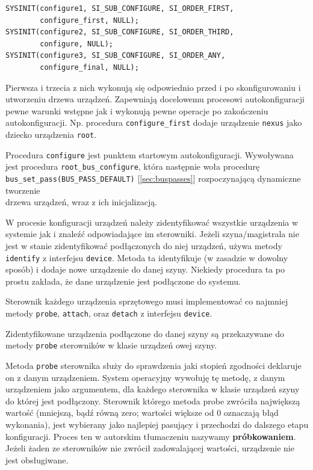 \documentclass[shortabstract,inz]{iithesis}
\begin{document}
\begin{lstlisting}[caption=Rejestracja procedur w podsystemie sysinit.]
SYSINIT(configure1, SI_SUB_CONFIGURE, SI_ORDER_FIRST, 
        configure_first, NULL);
SYSINIT(configure2, SI_SUB_CONFIGURE, SI_ORDER_THIRD, 
        configure, NULL);
SYSINIT(configure3, SI_SUB_CONFIGURE, SI_ORDER_ANY, 
        configure_final, NULL);
\end{lstlisting}

Pierwsza i trzecia z nich wykonują się odpowiednio przed i po skonfigurowaniu i utworzeniu drzewa urządzeń.
Zapewniają docelowemu procesowi autokonfiguracji pewne warunki wstępne jak i wykonują pewne operacje po
zakończeniu autokonfiguracji. Np. procedura \texttt{configure\_first} dodaje urządzenie \texttt{nexus}
jako dziecko urządzenia \texttt{root}.

Procedura \texttt{configure} jest punktem startowym autokonfiguracji.
Wywoływana jest procedura \texttt{root\_bus\_configure}, która następnie woła procedurę\\
\texttt{bus\_set\_pass(BUS\_PASS\_DEFAULT)} [\ref{sec:buspasses}] rozpoczynającą dynamiczne tworzenie \\
drzewa urządzeń, wraz z ich inicjalizacją.

W procesie konfiguracji urządzeń należy zidentyfikować wszystkie urządzenia w systemie jak i 
znaleźć odpowiadające im sterowniki. Jeżeli szyna/magistrala nie jest w stanie zidentyfikować
podłączonych do niej urządzeń, używa metody \texttt{identify} z interfejsu \texttt{device}.
Metoda ta identyfikuje (w zasadzie w dowolny sposób) i dodaje nowe urządzenie do danej szyny.
Niekiedy procedura ta po prostu zakłada, że dane urządzenie jest podłączone do systemu.

Sterownik każdego urządzenia sprzętowego musi implementować co najmniej metody \texttt{probe},
\texttt{attach}, oraz \texttt{detach} z interfejsu \texttt{device}.

Zidentyfikowane urządzenia podłączone do danej szyny są przekazywane do metody \texttt{probe}
sterowników w klasie urządzeń owej szyny. 

Metoda \texttt{probe} sterownika służy do sprawdzenia jaki stopień zgodności deklaruje on z danym urządzeniem.
System operacyjny wywołuję tę metodę, z danym urządzeniem jako argumentem, dla każdego sterownika w klasie urządzeń szyny
do której jest podłączony.
Sterownik którego metoda probe zwróciła największą wartość (mniejszą, bądź równą zero; 
wartości większe od 0 oznaczają błąd wykonania), jest wybierany jako najlepiej pasujący i przechodzi do
dalszego etapu konfiguracji. Proces ten w autorskim tłumaczeniu nazywamy \textbf{próbkowaniem}.
Jeżeli żaden ze sterowników nie zwrócił zadowalającej wartości, urządzenie nie jest obsługiwane.
\end{document}
